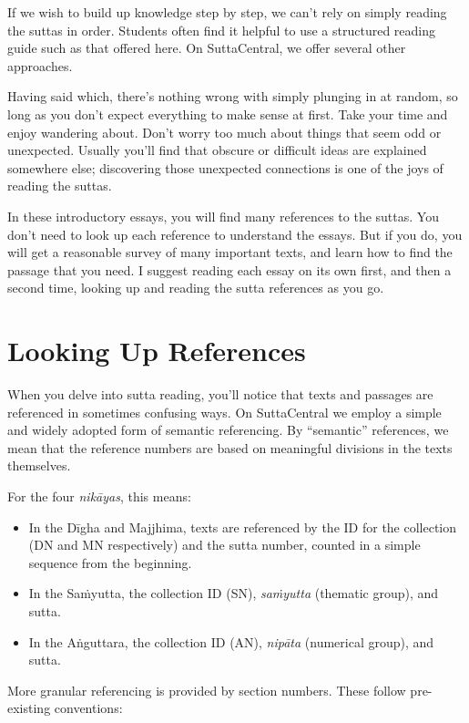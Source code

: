 \documentclass[12pt,openany]{book}%
\begin{document}
If we wish to build up knowledge step by step, we can’t rely on simply reading the suttas in order. Students often find it helpful to use a structured reading guide such as that offered here. On SuttaCentral, we offer several other approaches.

Having said which, there’s nothing wrong with simply plunging in at random, so long as you don’t expect everything to make sense at first. Take your time and enjoy wandering about. Don’t worry too much about things that seem odd or unexpected. Usually you’ll find that obscure or difficult ideas are explained somewhere else; discovering those unexpected connections is one of the joys of reading the suttas.

In these introductory essays, you will find many references to the suttas. You don’t need to look up each reference to understand the essays. But if you do, you will get a reasonable survey of many important texts, and learn how to find the passage that you need. I suggest reading each essay on its own first, and then a second time, looking up and reading the sutta references as you go.

\section*{Looking Up References}

When you delve into sutta reading, you’ll notice that texts and passages are referenced in sometimes confusing ways. On SuttaCentral we employ a simple and widely adopted form of semantic referencing. By “semantic” references, we mean that the reference numbers are based on meaningful divisions in the texts themselves.

For the four \textit{\textsanskrit{nikāyas}}, this means:

\begin{itemize}%
\item In the \textsanskrit{Dīgha} and Majjhima, texts are referenced by the ID for the collection (DN and MN respectively) and the sutta number, counted in a simple sequence from the beginning.%
\item In the \textsanskrit{Saṁyutta}, the collection ID (SN), \textit{\textsanskrit{saṁyutta}} (thematic group), and sutta.%
\item In the \textsanskrit{Aṅguttara}, the collection ID (AN), \textit{\textsanskrit{nipāta}} (numerical group), and sutta.%
\end{itemize}

More granular referencing is provided by section numbers. These follow pre-existing conventions:
\end{document}
